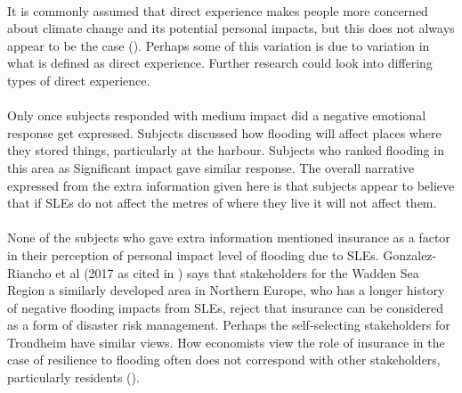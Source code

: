 \paragraph{}
It is commonly assumed that direct experience makes people more concerned about climate change and its potential personal impacts, but this does not always appear to be the case (\cite{lujala_role_2020}). Perhaps some of this variation is due to variation in what is defined as direct experience. Further research could look into differing types of direct experience. 
\paragraph{}
Only once subjects responded with medium impact did a negative emotional response get expressed. Subjects discussed how flooding will affect places where they stored things, particularly at the harbour. Subjects who ranked flooding in this area as Significant impact gave similar response. The overall narrative expressed from the extra information given here is that subjects appear to believe that if SLEs do not affect the metres of where they live it will not affect them. 
\paragraph{}
None of the subjects who gave extra information mentioned insurance as a factor in their perception of personal impact level of flooding due to SLEs. Gonzalez-Riancho et al (2017 as cited in \cite{gerkensmeier_governing_2018}) says that stakeholders for the Wadden Sea Region a similarly developed area in Northern Europe, who has a longer history of negative flooding impacts from SLEs, reject that insurance can be considered as a form of disaster risk management. Perhaps the self-selecting stakeholders for Trondheim have similar views. How economists view the role of insurance in the case of resilience to flooding often does not correspond with other stakeholders, particularly residents (\cite{gerkensmeier_governing_2018}).


